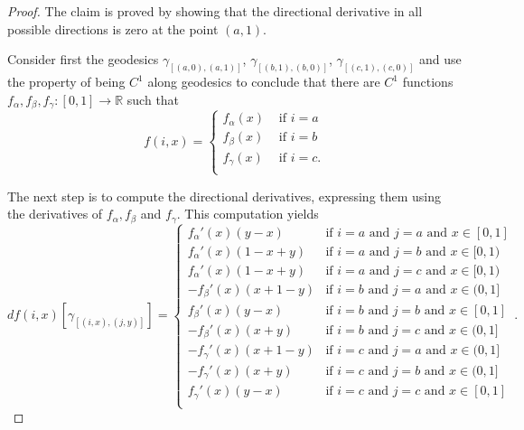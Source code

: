 \documentclass[10pt,a4paper]{amsart}
\newcommand{\bbR}{\mathbb{R}}
\begin{document}
\begin{proof}
The claim is proved by showing that the directional derivative in all possible 
directions is zero at the point $(a, 1)$.   

Consider first the geodesics
  $\gamma_{[(a, 0), (a, 1)]}$, $\gamma_{[(b, 1), (b, 0)]}$, $\gamma_{[(c, 1), (c, 0)]}$ and use
  the property of being $C^1$ along geodesics to conclude that there are $C^1$ functions
  $f_\alpha, f_\beta, f_\gamma:[0, 1] \to \bbR$ such that
  \begin{equation*}
    f(i, x) =
    \left\{
      \begin{array}{ll}
        f_\alpha(x) & \text{ if } i = a  \\
        f_\beta(x) & \text{ if } i = b  \\
        f_\gamma(x) & \text{ if } i = c. \\
      \end{array}
    \right.
  \end{equation*}

  The next step is to compute the directional derivatives, expressing
  them using the derivatives of $f_\alpha,f_\beta$ and $f_\gamma$.
This computation yields
  \begin{equation*}
    df(i, x)[\gamma_{[(i, x), (j, y)]}] =
    \left\{
      \begin{array}{ll}
        f_\alpha'(x) (y - x)
        & \!\!\text{if } i = a \text{ and } j = a \text{ and } x \in [0, 1] \\
        f_\alpha'(x) (1 - x + y)
        & \!\!\text{if } i = a \text{ and } j = b \text{ and } x \in [0, 1) \\
        f_\alpha'(x) (1 - x + y)
        & \!\!\text{if } i = a \text{ and } j = c \text{ and } x \in [0, 1) \\
        - f_\beta'(x) (x + 1 - y)
        & \!\!\text{if } i = b \text{ and } j = a \text{ and } x \in (0, 1]  \\
        f_\beta'(x) (y - x)
        & \!\!\text{if } i = b \text{ and } j = b \text{ and } x \in [0, 1] \\
        - f_\beta'(x) (x + y)
        & \!\!\text{if } i = b \text{ and } j = c \text{ and } x \in (0, 1] \\
        - f_\gamma'(x) (x + 1 - y)
        & \!\!\text{if } i = c \text{ and } j = a \text{ and } x \in (0, 1] \\
        - f_\gamma'(x) (x + y)
        & \!\!\text{if } i = c \text{ and } j = b \text{ and } x \in (0, 1] \\
        f_\gamma'(x) (y - x)
        & \!\!\text{if } i = c \text{ and } j = c \text{ and } x \in [0, 1] \\
      \end{array}
    \right. .
  \end{equation*}


\end{proof}
\end{document}
